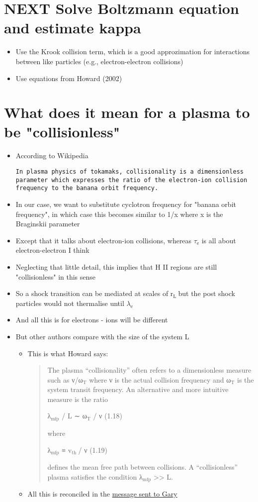 \documentclass[11pt]{article}
\begin{document}
\section{{\bfseries\sffamily NEXT} Solve Boltzmann equation and estimate kappa}
\label{sec:orgheadline34}
\begin{itemize}
\item Use the Krook collision term, which is a good approzimation for interactions between like particles (e.g., electron-electron collisions)
\item Use equations from Howard (2002)
\end{itemize}
\section{What does it mean for a plasma to be "collisionless"}
\label{sec:orgheadline35}
\begin{itemize}
\item According to Wikipedia
\begin{verbatim}
In plasma physics of tokamaks, collisionality is a dimensionless parameter which expresses the ratio of the electron-ion collision frequency to the banana orbit frequency.
\end{verbatim}
\item In our case, we want to substitute cyclotron frequency for "banana orbit frequency", in which case this becomes similar to 1/x where x is the Braginskii parameter
\item Except that it talks about electron-ion collisions, whereas \(\tau_{\text{e}}\) is all about electron-electron I think
\item Neglecting that little detail, this implies that H II regions are still "collisionless" in this sense
\item So a shock transition can be mediated at scales of r\(_{\text{L }}\)but the post shock particles would not thermalise until \(\lambda_{\text{e}}\)
\item And all this is for electrons - ions will be different
\item But other authors compare with the size of the system L
\begin{itemize}
\item This is what Howard says:
\begin{quote}
The plasma “collisionality” often refers to a dimensionless measure such as ν/ω\(_{\text{T}}\) where ν is the actual collision frequency and ω\(_{\text{T}}\) is the system transit frequency. An alternative and more intuitive measure is the ratio 

λ\(_{\text{mfp}}\) / L ∼ ω\(_{\text{T}}\) / ν (1.18) 

where

λ\(_{\text{mfp}}\) ≡ v\(_{\text{th }}\)/ ν (1.19)

defines the mean free path between collisions. A “collisionless” plasma satisfies the condition λ\(_{\text{mfp}}\) >> L. 
\end{quote}
\item All this is reconciled in the \hyperref[sec:orgheadline5]{message sent to Gary}
\end{itemize}
\end{itemize}
\end{document}
